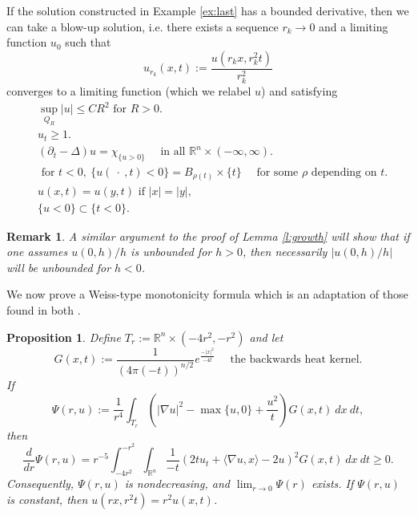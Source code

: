 \documentclass{amsart}
\newtheorem{proposition}[theorem]{Proposition}
\newtheorem{remark}[theorem]{Remark}
\numberwithin{equation}{section}
\begin{document}
If the solution constructed in Example \ref{ex:last} has a bounded derivative, then we can take a blow-up solution, i.e. there exists a sequence $r_k \to 0$ and a limiting function $u_0$ such that 
\[
u_{r_k}(x,t):=\frac{u(r_kx, r_k^2 t)}{r_k^2}
\]
converges to a limiting function (which we relabel $u$) and satisfying 
\begin{align}
 & \sup_{Q_R} |u| \leq C R^2 \text{ for } R>0. \label{e:growth} \\
 & u_t \geq 1. \\
 & (\partial_t - \Delta)u = \chi_{\{u>0\}} \quad \text{ in all } \mathbb{R}^n \times (-\infty,\infty). \label{e:solve}\\
 &\text{ for } t<0, \ \{u(\ \cdot\ , t)<0\}=B_{\rho(t)} \times \{t\}\quad \text{ for some $\rho$ depending on } t. \label{e:rhot}\\
 & u(x,t)=u(y,t) \text{ if } |x|=|y|, \label{e:symmetry} \\
 & \{u<0\} \subset \{t<0\} \label{e:below}. 
\end{align}

\begin{remark} \label{r:1bound}
 A similar argument to the proof of Lemma \ref{l:growth} will show that if one assumes $u(0,h)/h$ is unbounded for $h>0$, then necessarily $|u(0,h)/h|$ will be unbounded for $h<0$. 
\end{remark}


We now prove a Weiss-type monotonicity formula which is an adaptation of those found in both \cite{w99,aw06}. 

\begin{proposition} \label{p:weiss}
 Define $T_r:= \mathbb{R}^n \times(-4r^2,-r^2)$ and let 
 \[
 G(x,t):=\frac{1}{(4\pi (-t))^{n/2}} e^{\frac{-|x|^2}{-4t}} \quad \text{ the backwards heat kernel.}
 \]
 If 
 \[
 \Psi(r,u):=\frac{1}{r^4} \int_{T_r} \left(|\nabla u|^2- \max\{u,0\} +\frac{u^2}{t} \right)G(x,t) \ dx \ dt, 
 \]
 then 
 \[
 \frac{d}{dr} \Psi(r,u)=r^{-5}\int_{-4r^2}^{-r^2} \int_{\mathbb{R}^n} \frac{1}{-t} \left(2t u_t +  \langle \nabla u, x \rangle -2 u\right)^2 G(x,t) \ dx \ dt\geq 0. 
 \]
 Consequently, $\Psi(r,u)$ is nondecreasing, and $\lim_{r \to 0} \Psi(r)$ exists. If $\Psi(r,u)$ is constant, then $u(rx,r^2t)=r^2u(x,t)$. 
\end{proposition}
\end{document}
